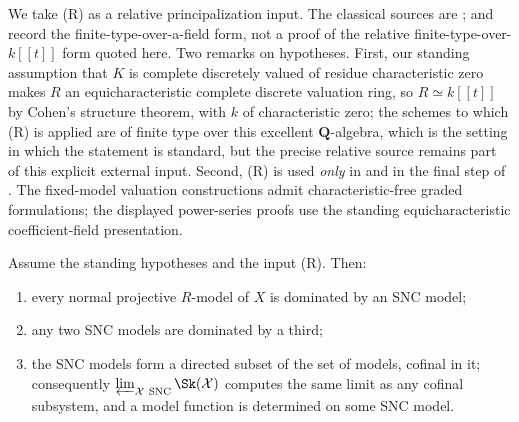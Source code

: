 We take \textup{(R)} as a relative principalization input.  The classical
sources are \cite{Hironaka1964I,Hironaka1964II};
 and  record the
finite-type-over-a-field form, not a proof of the relative
finite-type-over-$k[[t]]$ form quoted here. Two remarks
on hypotheses. First, our standing assumption that $K$ is complete
discretely valued of residue characteristic zero makes $R$ an
equicharacteristic complete discrete valuation ring, so $R\simeq k[[t]]$
by Cohen's structure theorem, with $k$ of characteristic zero; the schemes
to which (R) is applied are of finite type over this excellent
$\mathbf Q$-algebra, which is the setting in which the statement is
standard, but the precise relative source remains part of this explicit
external input. Second, (R) is used \emph{only} in  and
in the final step of . The fixed-model
valuation constructions admit characteristic-free graded formulations;
the displayed power-series proofs use the standing equicharacteristic
coefficient-field presentation.

\begin{proposition}
\label{prop:snc-cofinal}
Assume the standing hypotheses and the input \textup{(R)}. Then:
\begin{enumerate}
\item every normal projective $R$-model of $X$ is dominated by an SNC
  model;
\item any two SNC models are dominated by a third;
\item the SNC models form a directed subset of the set of models, cofinal in
  it; consequently
  $\varprojlim_{\mathcal X\ \mathrm{SNC}}\Sk(\mathcal X)$ computes the
  same limit as any cofinal subsystem, and a model function is determined on
  some SNC model.
\end{enumerate}
\end{proposition}

